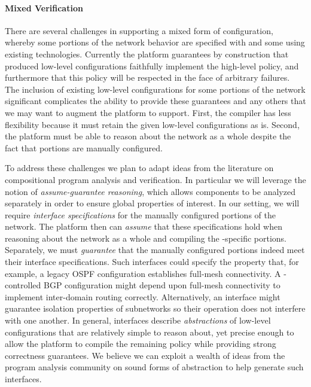 \paragraph{Mixed Verification} There are several challenges in supporting a mixed form of configuration, whereby some portions of the network behavior are specified with \Name and some using existing technologies.  Currently the \Propane platform guarantees by construction that produced low-level configurations faithfully implement the high-level policy, and furthermore that this policy will be respected in the face of arbitrary failures.  The inclusion of existing low-level configurations for some portions of the network significant complicates the ability to provide these guarantees and any others that we may want to augment the platform to support. First, the \Name compiler has less flexibility because it must retain the given low-level configurations as is.  Second, the \Name platform must be able to reason about the network as a whole despite the fact that portions are manually configured.

To address these challenges we plan to adapt ideas from the literature on compositional program analysis and verification.  In particular we will leverage the notion of {\em assume-guarantee reasoning}, which allows components to be analyzed separately in order to ensure global properties of interest.  In our setting, we will require {\em interface specifications} for the manually configured portions of the network. 
The \Name platform then can {\em assume} that these specifications hold when reasoning about the network as a whole and compiling the \Name-specific portions.  Separately, we must {\em guarantee} that the manually configured portions indeed meet their interface specifications.
Such interfaces could specify the property that, for example, a legacy OSPF configuration establishes full-mesh connectivity.  A
\Name-controlled BGP configuration might depend upon full-mesh connectivity to implement inter-domain routing correctly.
Alternatively, an interface might guarantee isolation properties of subnetworks so their
operation does not interfere with one another. In general, interfaces 
describe {\em abstractions} of low-level configurations that are relatively simple to reason about, yet precise enough to allow the platform to compile the remaining \Name policy while providing strong correctness guarantees.
We believe we can exploit a wealth of ideas from the program analysis community on sound forms of abstraction
to help generate such interfaces. 

